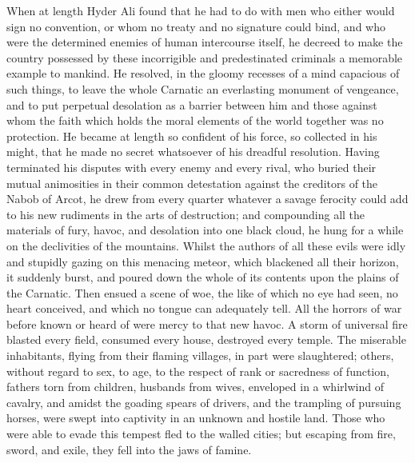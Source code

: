 When at length Hyder Ali found that he had to do with men who either would sign no convention, or whom no treaty and no signature could bind, and who were the determined enemies of human intercourse itself, he decreed to make the country possessed by these incorrigible and predestinated criminals a memorable example to mankind. He resolved, in the gloomy recesses of a mind capacious of such things, to leave the whole Carnatic an everlasting monument of vengeance, and to put perpetual desolation as a barrier between him and those against whom the faith which holds the moral elements of the world together was no protection. He became at length so confident of his force, so collected in his might, that he made no secret whatsoever of his dreadful resolution. Having terminated his disputes with every enemy and every rival, who buried their mutual animosities in their common detestation against the creditors of the Nabob of Arcot, he drew from every quarter whatever a savage ferocity could add to his new rudiments in the arts of destruction; and compounding all the materials of fury, havoc, and desolation into one black cloud, he hung for a while on the declivities of the mountains. Whilst the authors of all these evils were idly and stupidly gazing on this menacing meteor, which blackened all their horizon, it suddenly burst, and poured down the whole of its contents upon the plains of the Carnatic. Then ensued a scene of woe, the like of which no eye had seen, no heart conceived, and which no tongue can adequately tell. All the horrors of war before known or heard of were mercy to that new havoc. A storm of universal fire blasted every field, consumed every house, destroyed every temple. The miserable inhabitants, flying from their flaming villages, in part were slaughtered; others, without regard to sex, to age, to the respect of rank or sacredness of function, fathers torn from children, husbands from wives, enveloped in a whirlwind of cavalry, and amidst the goading spears of drivers, and the trampling of pursuing horses, were swept into captivity in an unknown and hostile land. Those who were able to evade this tempest fled to the walled cities; but escaping from fire, sword, and exile, they fell into the jaws of famine.

